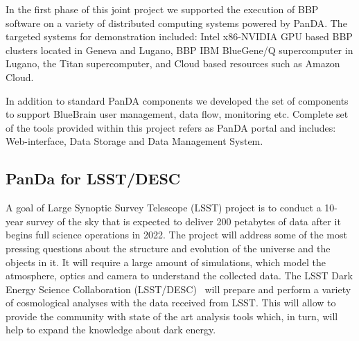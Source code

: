 \documentclass{webofc}
\begin{document}
In the first phase of this joint project we supported the execution of BBP software on a variety of distributed computing systems powered by PanDA. 
The targeted systems for demonstration included: Intel x86-NVIDIA GPU based BBP clusters located in Geneva and Lugano, BBP IBM BlueGene/Q supercomputer in Lugano, the Titan supercomputer, and Cloud based resources such as Amazon Cloud.


In addition to standard PanDA components we developed the set of components to support BlueBrain user management, data flow, monitoring etc. 
Complete set of the tools provided within this project refers as PanDA portal and includes: Web-interface, Data Storage and Data Management System. 


\subsection{PanDa for LSST/DESC} \label{section_lsst_desc}

A goal of Large Synoptic Survey Telescope (LSST) project is to conduct a 10-year survey of the sky that is expected to deliver 200 petabytes of data after it begins full science operations in 2022. 
The project will address some of the most pressing questions about the structure and evolution of the universe and the objects in it. 
It will require a large amount of simulations, which model the atmosphere, optics and camera to understand the collected data. 
The LSST Dark Energy Science Collaboration (LSST/DESC)~\cite{lsst-desc} will prepare and perform a variety of cosmological analyses with the data received from LSST. 
This will allow to provide the community with state of the art analysis tools which, in turn, will help to expand the knowledge about dark energy.
\end{document}
